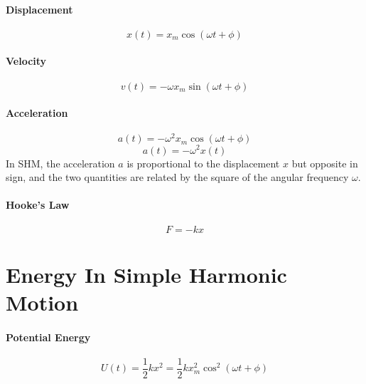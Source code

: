 \documentclass{article}
\begin{document}
        \paragraph{Displacement}
        \begin{equation}
            x(t) = x_m \cos{\left( \omega t + \phi \right)}
        \end{equation}

        \paragraph{Velocity}
        \begin{equation}
            v(t) = - \omega x_m \sin{\left( \omega t + \phi \right)}
        \end{equation}

        \paragraph{Acceleration}
        \begin{equation}
            a(t) = - \omega^2 x_m \cos{\left( \omega t + \phi \right)}
        \end{equation}
        \begin{equation}
            a(t) = - \omega^2 x(t)
        \end{equation}
        In SHM, the acceleration $a$ is proportional to the displacement $x$ but opposite in sign, and the two quantities are related by the square of the angular frequency $\omega$.

        \paragraph{Hooke's Law}
        \begin{equation}
            F = - k x
        \end{equation}

    \section{Energy In Simple Harmonic Motion}

        \paragraph{Potential Energy}
        \begin{equation}
            U(t) = \frac{1}{2} k x^2 = \frac{1}{2} k x_m^2 \cos^2 \left( \omega t + \phi \right)
        \end{equation}
\end{document}
